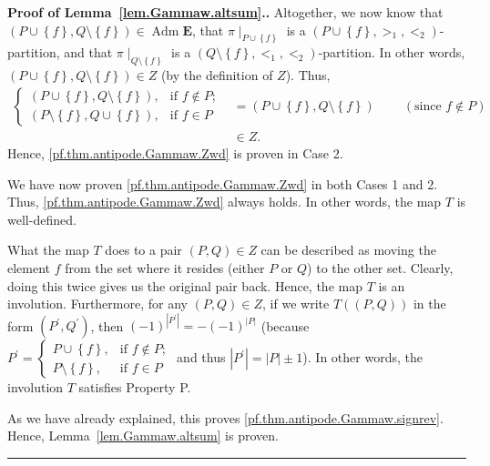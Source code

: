 \documentclass[numbers=enddot,12pt,final,onecolumn,notitlepage,abstracton]{scrartcl}%
\theoremstyle{definition}
\newenvironment{proof}[1][Proof]{\noindent\textbf{#1.} }{\ \rule{0.5em}{0.5em}}
\newcommand{\Adm}{\operatorname{Adm}}
\newcommand{\EE}{{\mathbf{E}}}
\begin{document}
\begin{proof}[Proof of Lemma~\ref{lem.Gammaw.altsum}.]
Altogether, we now know that $\left(  P\cup\left\{  f\right\}  ,Q\setminus
\left\{  f\right\}  \right)  \in \Adm \EE$, that $\pi
\mid_{P\cup\left\{  f\right\}  }$ is a $\left(  P\cup\left\{  f\right\}
,>_{1},<_{2}\right)  $-partition, and that $\pi\mid_{Q\setminus\left\{
f\right\}  }$ is a $\left(  Q\setminus\left\{  f\right\}  ,<_{1},<_{2}\right)
$-partition. In other words, $\left(  P\cup\left\{  f\right\}  ,Q\setminus
\left\{  f\right\}  \right)  \in Z$ (by the definition of $Z$). Thus,
\begin{align*}
\begin{cases}
\left(  P\cup\left\{  f\right\}  ,Q\setminus\left\{  f\right\}  \right)  , &
\text{if }f\notin P;\\
\left(  P\setminus\left\{  f\right\}  ,Q\cup\left\{  f\right\}  \right)  , &
\text{if }f\in P
\end{cases}
& =\left(  P\cup\left\{  f\right\}  ,Q\setminus\left\{  f\right\}  \right)
\ \ \ \ \ \ \ \ \ \ \left(  \text{since }f\notin P\right)  \\
& \in Z.
\end{align*}
Hence, \eqref{pf.thm.antipode.Gammaw.Zwd} is proven in Case 2.

We have now proven \eqref{pf.thm.antipode.Gammaw.Zwd} in both Cases 1 and 2.
Thus, \eqref{pf.thm.antipode.Gammaw.Zwd} always holds. In other words, the map
$T$ is well-defined.


What the map $T$ does to a pair $\left(  P,Q\right)  \in Z$ can be described
as moving the element $f$ from the set where it resides (either $P$ or $Q$) to
the other set. Clearly, doing this twice gives us the original pair back.
Hence, the map $T$ is an involution. Furthermore, for any $\left(  P,Q\right)
\in Z$, if we write $T\left(  \left(  P,Q\right)  \right)  $ in the form
$\left(  P^{\prime},Q^{\prime}\right)  $, then $\left(  -1\right)
^{\left\vert P^{\prime}\right\vert }=-\left(  -1\right)  ^{\left\vert
P\right\vert }$ (because $P^{\prime}=
\begin{cases}
P\cup\left\{  f\right\}  , & \text{if }f\notin P;\\
P\setminus\left\{  f\right\}  , & \text{if }f\in P
\end{cases}
$ and thus
$\left|P^\prime\right| = \left|P\right| \pm 1$).
In other words, the involution $T$ satisfies Property P.

As we have already
explained, this proves \eqref{pf.thm.antipode.Gammaw.signrev}. Hence,
Lemma~\ref{lem.Gammaw.altsum} is proven.
\end{proof}
\end{document}
